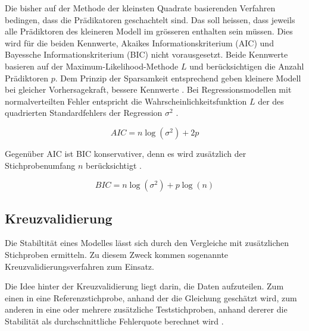 \documentclass[english,12pt,doc]{apa}
\begin{document}
Die bisher auf der Methode der kleinsten Quadrate basierenden Verfahren bedingen, dass die Prädikatoren geschachtelt sind. 
Das soll heissen, dass jeweils alle Prädiktoren des kleineren Modell im grösseren enthalten sein müssen. 
Dies wird für die  beiden Kennwerte, Akaikes Informationskriterium (AIC) und  Bayessche Informationskriterium (BIC) nicht vorausgesetzt. 
Beide Kennwerte basieren auf der Maximum-Likelihood-Methode $L$ und  berücksichtigen die Anzahl Prädiktoren $p$. 
Dem Prinzip der Sparsamkeit entsprechend geben kleinere Modell bei gleicher Vorhersagekraft, bessere Kennwerte \cite[p. 509]{jacob2003applied}. 
Bei Regressionsmodellen mit normalverteilten Fehler entspricht die Wahrscheinlichkeitsfunktion $L$ der des quadrierten Standardfehlers der Regression $\sigma^2$ \cite[p. 169]{weakliem2004introduction}. 

\begin{equation}
AIC = n \log(\sigma^2) + 2p
\tag{AIC}
\end{equation}

Gegenüber AIC ist BIC konservativer, denn es wird zusätzlich der Stichprobenumfang $n$ berücksichtigt \cite[p. 169]{weakliem2004introduction}. 

\begin{equation}
BIC = n\log(\sigma^2) + p\log(n)
\tag{BIC}
\end{equation}


\subsection{Kreuzvalidierung}
Die Stabiltität eines Modelles lässt sich durch den Vergleiche mit zusätzlichen Stichproben ermitteln.
Zu diesem Zweck kommen sogenannte Kreuzvalidierungsverfahren zum Einsatz.

Die Idee hinter der Kreuzvalidierung liegt darin, die Daten aufzuteilen. Zum einen in eine Referenzstichprobe, anhand der die Gleichung geschätzt wird, zum anderen in eine oder mehrere zusätzliche Teststichproben, anhand dererer die Stabilität als durchschnittliche Fehlerquote berechnet wird \cite[p. 3]{arlot2010survey}.
\end{document}
